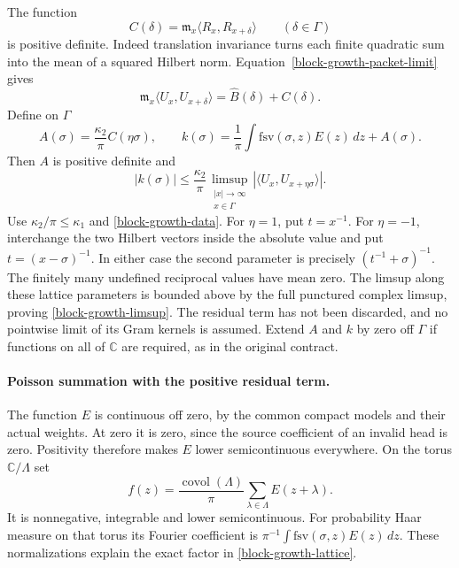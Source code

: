 The function
\[
 C(\delta)=\mathfrak m_x\langle R_x,R_{x+\delta}\rangle
       \qquad(\delta\in\Gamma)
\]
is positive definite.  Indeed translation invariance turns
each finite quadratic sum into the mean of a squared Hilbert
norm.  Equation~\eqref{block-growth-packet-limit} gives
\[
 \mathfrak m_x\langle U_x,U_{x+\delta}\rangle
                  =\widehat B(\delta)+C(\delta).
\]
Define on $\Gamma$
\begin{equation}\label{block-growth-k}
 A(\sigma)=\frac{\kappa_2}\pi C(\eta\sigma),\qquad
 k(\sigma)=\frac1\pi\int\mathrm{fsv}(\sigma,z)E(z)\,dz
                       +A(\sigma).
\end{equation}
Then $A$ is positive definite and
\[
 |k(\sigma)|\le\frac{\kappa_2}\pi
       \limsup_{\substack{|x|\to\infty\\x\in\Gamma}}
                      |\langle U_x,U_{x+\eta\sigma}\rangle|.
\]
Use $\kappa_2/\pi\le\kappa_1$ and
\eqref{block-growth-data}.  For $\eta=1$, put $t=x^{-1}$.
For $\eta=-1$, interchange the two Hilbert vectors inside
the absolute value and put $t=(x-\sigma)^{-1}$.
In either case the second parameter is precisely
$(t^{-1}+\sigma)^{-1}$.  The finitely many undefined reciprocal
values have mean zero.  The limsup along these lattice parameters
is bounded above by the full punctured complex limsup, proving
\eqref{block-growth-limsup}.  The residual term has not been
discarded, and no pointwise limit of its Gram kernels is assumed.
Extend $A$ and $k$ by zero off $\Gamma$ if functions on all of
$\mathbb C$ are required, as in the original contract.

\paragraph{Poisson summation with the positive residual term.}
The function $E$ is continuous off zero, by the common compact
models and their actual weights.  At zero it is zero, since the
source coefficient of an invalid head is zero.  Positivity therefore
makes $E$ lower semicontinuous everywhere.  On the torus
$\mathbb C/\Lambda$ set
\[
        f(z)=\frac{\operatorname{covol}(\Lambda)}\pi
                         \sum_{\lambda\in\Lambda}E(z+\lambda).
\]
It is nonnegative, integrable and lower semicontinuous.  For
probability Haar measure on that torus its Fourier coefficient is
$\pi^{-1}\int\mathrm{fsv}(\sigma,z)E(z)\,dz$.
These normalizations
explain the exact factor in \eqref{block-growth-lattice}.


